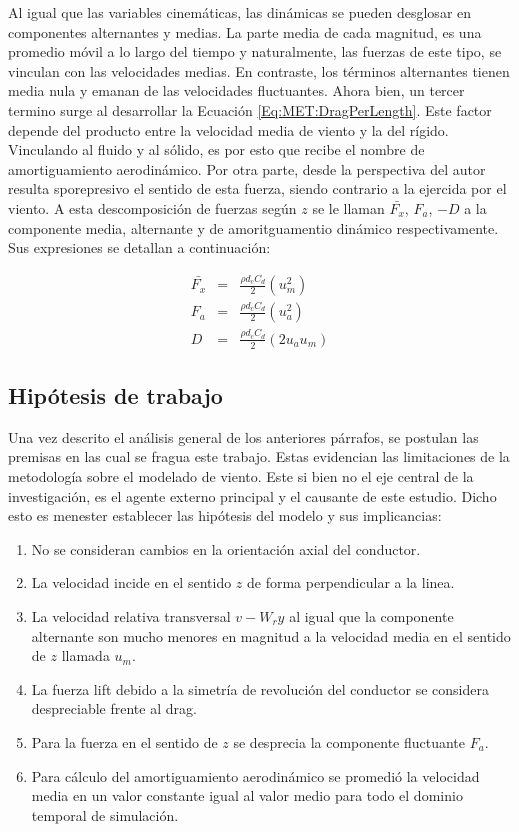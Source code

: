 Al igual que las variables cinemáticas, las dinámicas se pueden desglosar en componentes alternantes y medias. La parte media de cada magnitud, es una promedio móvil a lo largo del tiempo y naturalmente, las fuerzas de este tipo, se vinculan con las velocidades medias. En contraste, los términos alternantes tienen media nula y emanan de las velocidades fluctuantes. Ahora bien, un tercer termino surge al desarrollar la Ecuación \eqref{Eq:MET:DragPerLength}. Este factor depende del producto entre la velocidad media de viento y la del rígido. Vinculando al fluido y al sólido, es por esto que recibe el nombre de amortiguamiento aerodinámico. Por otra parte, desde la perspectiva del autor resulta sporepresivo el sentido de esta fuerza, siendo contrario a la ejercida por el viento.  A esta descomposición de fuerzas según $z$ se le llaman $\bar{F_x}$, $F_a$, $-D$ a la componente media, alternante y de amoritguamentio dinámico respectivamente. Sus expresiones se detallan a continuación: 

\begin{eqnarray}
\bar{F_x} &=&  \frac{\rho d_c C_d}{2} (u_m^2)\\
F_a &=&  \frac{\rho d_c C_d}{2} (u_a^2)\\
\label{Eq:MET:AmortAerodniamic}
D  &=& \frac{\rho d_c C_d}{2} (2u_au_m)
\end{eqnarray}

\subsection{Hipótesis de trabajo} 
Una vez descrito el análisis general de los anteriores párrafos, se postulan las premisas en las cual se fragua este trabajo. Estas evidencian las limitaciones de la metodología sobre el modelado de viento. Este si bien no el eje central de la investigación, es el agente externo principal y el causante de este estudio. Dicho esto es menester establecer las hipótesis del modelo y sus implicancias:

\begin{enumerate}
	\item No se consideran cambios en la orientación axial del conductor.
	\item La velocidad incide en el sentido $z$ de forma perpendicular a la linea. 
	\item La velocidad relativa transversal $v-W_ry$ al igual que la componente alternante son mucho menores en magnitud a la velocidad media en el sentido de $z$ llamada $u_m$.
	\item La fuerza lift debido a la simetría de revolución del conductor se considera despreciable frente al drag.
	\item Para la fuerza en el sentido de $z$ se desprecia la componente fluctuante $F_a$.
	\item Para cálculo del amortiguamiento aerodinámico se promedió la velocidad media en un valor constante igual al valor medio para todo el dominio temporal de simulación. 
\end{enumerate}

